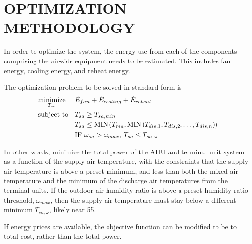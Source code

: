 
%
%
%

\chapter{\texorpdfstring{\MakeUppercase{Optimization Methodology}}{Optimization Methodology}}

In order to optimize the system, the energy use from each of the components
comprising the air-side equipment needs to be estimated. This includes fan
energy, cooling energy, and reheat energy.

The optimization problem to be solved in standard form is
\begin{equation}
    \begin{aligned}
        & \underset{T_{sa}}{\text{minimize}} & & \dot{E}_{fan} + \dot{E}_{cooling} + \dot{E}_{reheat} \\
        & \text{subject to} & & T_{sa} \geq T_{sa,min} \\
        &&& T_{sa} \leq \text{MIN}\left(T_{ma}, \text{MIN}\left(T_{dis,1}, T_{dis,2}, \ldots, T_{dis,n} \right) \right) \\
        &&& \text{IF } \omega_{oa} > \omega_{max},\,T_{sa} \leq T_{sa,\omega}
    \end{aligned}
\end{equation}

In other words, minimize the total power of the AHU and terminal unit
system as a function of the supply air temperature, with the constraints
that the supply air temperature is above a preset minimum, and less than
both the mixed air temperature and the minimum of the discharge air
temperatures from the terminal units. If the outdoor air humidity ratio
is above a preset humidity ratio threshold, \(\omega_{max}\), then the
supply air temperature must stay below a different minimum
\(T_{sa,\omega}\), likely near \SI{55}{\degF}.

If energy prices are available, the objective function can be modified
to be to total cost, rather than the total power.

